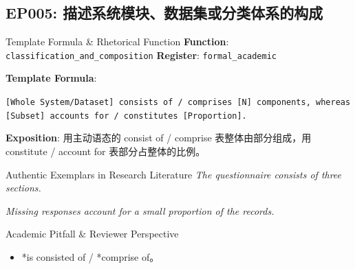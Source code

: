 \subsection{EP005: 描述系统模块、数据集或分类体系的构成}\label{sec:ep:EP005}
\begin{ConceptBox}{Template Formula \& Rhetorical Function}
\textbf{Function}: \texttt{classification\_and\_composition} \quad \textbf{Register}: \texttt{formal\_academic}\par\vspace{3pt}
\textbf{Template Formula}:\par\noindent\texttt{[Whole System/Dataset] consists of / comprises [N] components, whereas [Subset] accounts for / constitutes [Proportion].}\par\vspace{4pt}
\textbf{Exposition}: 用主动语态的 consist of / comprise 表整体由部分组成，用 constitute / account for 表部分占整体的比例。
\end{ConceptBox}
\begin{ExampleBox}{Authentic Exemplars in Research Literature}
\textit{The questionnaire consists of three sections.}\par\vspace{2pt}
\textit{Missing responses account for a small proportion of the records.}\par\vspace{2pt}
\end{ExampleBox}
\begin{TipBox}{Academic Pitfall \& Reviewer Perspective}
\begin{itemize}[leftmargin=1.5em, itemsep=1pt]
  \item *is consisted of / *comprise of。
\end{itemize}
\end{TipBox}
\vspace{6pt}
